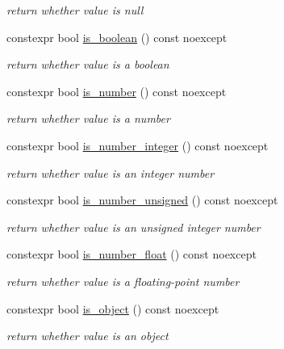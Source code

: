 \begin{DoxyCompactItemize}
\begin{DoxyCompactList}\small\item\em return whether value is null \end{DoxyCompactList}\item 
constexpr bool \hyperlink{classnlohmann_1_1basic__json_adade77415e7f7bf08a9b5150c742714d}{is\-\_\-boolean} () const noexcept
\begin{DoxyCompactList}\small\item\em return whether value is a boolean \end{DoxyCompactList}\item 
constexpr bool \hyperlink{classnlohmann_1_1basic__json_a957eb9594c7f0ca93212c30f3a400873}{is\-\_\-number} () const noexcept
\begin{DoxyCompactList}\small\item\em return whether value is a number \end{DoxyCompactList}\item 
constexpr bool \hyperlink{classnlohmann_1_1basic__json_a435c93d06ef28f8003c31f62ffe4aed1}{is\-\_\-number\-\_\-integer} () const noexcept
\begin{DoxyCompactList}\small\item\em return whether value is an integer number \end{DoxyCompactList}\item 
constexpr bool \hyperlink{classnlohmann_1_1basic__json_aa388dc101bc285a98122a38fd2e3a9db}{is\-\_\-number\-\_\-unsigned} () const noexcept
\begin{DoxyCompactList}\small\item\em return whether value is an unsigned integer number \end{DoxyCompactList}\item 
constexpr bool \hyperlink{classnlohmann_1_1basic__json_a7641371be8a347f3c1e05ac089a74c36}{is\-\_\-number\-\_\-float} () const noexcept
\begin{DoxyCompactList}\small\item\em return whether value is a floating-\/point number \end{DoxyCompactList}\item 
constexpr bool \hyperlink{classnlohmann_1_1basic__json_a94ba313c00f1713fa4be85de64083754}{is\-\_\-object} () const noexcept
\begin{DoxyCompactList}\small\item\em return whether value is an object \end{DoxyCompactList}\item 

\end{DoxyCompactItemize}
